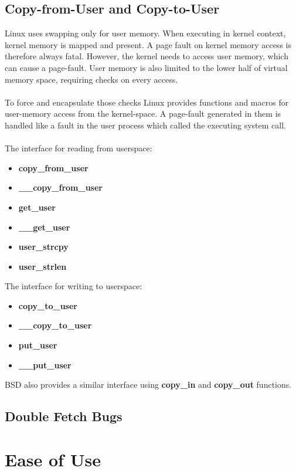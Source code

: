 \documentclass[conference]{IEEEtran}
\begin{document}
\subsection{Copy-from-User and Copy-to-User}
Linux uses swapping only for user memory. When executing in kernel context, kernel memory is mapped and present. A page fault on kernel memory access is therefore always fatal. However, the kernel needs to access user memory, which can cause a page-fault. User memory is also limited to the lower half of virtual memory space, requiring checks on every access.
\\
\\
To force and encapsulate those checks Linux provides functions and macros for user-memory access from the kernel-space. A page-fault generated in them is handled like a fault in the user process which called the executing system call.
\\
\\
The interface for reading from userspace:
\begin{itemize}
    \item \textbf{copy\_from\_user}
    \item \textbf{\_\_copy\_from\_user}
    \item \textbf{get\_user}
    \item \textbf{\_\_get\_user}
    \item \textbf{user\_strcpy}
    \item \textbf{user\_strlen}
\end{itemize}
\bigskip
The interface for writing to userspace:
\begin{itemize}
    \item \textbf{copy\_to\_user}
    \item \textbf{\_\_copy\_to\_user}
    \item \textbf{put\_user}
    \item \textbf{\_\_put\_user}
\end{itemize}
\bigskip
BSD also provides a similar interface using \textbf{copy\_in} and \textbf{copy\_out} functions.

\subsection{Double Fetch Bugs}
\label{sec:doublefetch}



\section{Ease of Use}
\end{document}
